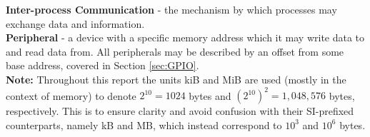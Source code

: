     \noindent \textbf{Inter-process Communication} - the mechanism by which
    processes may exchange data and information. \\
        
    \noindent \textbf{Peripheral} - a device with a specific memory address
    which it may write data to and read data from. All peripherals may be
    described by an offset from some base address, covered in Section
    \ref{sec:GPIO}. \\

    \noindent\textbf{Note:} Throughout this report the units kiB and MiB are
    used (mostly in the context of memory) to denote $2^{10} = 1024$ bytes and
    $(2^{10})^2=1,048,576$ bytes, respectively.  This is to ensure clarity and
    avoid confusion with their SI-prefixed counterparts, namely kB and MB, which
    instead correspond to $10^3$ and $10^6$ bytes.
